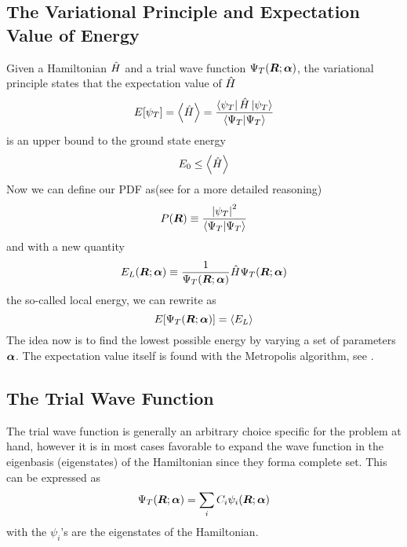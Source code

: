     \subsection{The Variational Principle and Expectation Value of Energy}
        Given a Hamiltonian $\hat{H}$ and a trial wave function ${\Psi}_T(\boldsymbol{{R}};\boldsymbol{{\alpha}})$, the
        variational principle \cite{GriffQuan, NeOr} states that the
        expectation value of $\hat{H}$
            \begin{equation}
                E[\psi_T] = \left< {\hat{H}} \right> =
                \frac{\bra{\psi_T}\hat{H}\ket{\psi_T}}{\bra{\Psi_T}\ket{\Psi_T}}
                \label{eq:ecpE}
            \end{equation}
        is an upper bound to the ground state energy
            \begin{equation}
                E_0 \leq \left< {\hat{H}} \right>
                \label{eq:ecpEBound}
            \end{equation}
        Now we can define our PDF as(see  for a more
        detailed reasoning)
            \begin{equation}
                P(\boldsymbol{{R}}) \equiv \frac{\abs{\psi_T}^2}{\bra{\Psi_T}\ket{\Psi_T}}
                \label{eq:PDFdef}
            \end{equation}
        and with a new quantity
            \begin{equation}
                E_L(\boldsymbol{{R}};\boldsymbol{{\alpha}}) \equiv \frac{1}{{\Psi}_T(\boldsymbol{{R}};\boldsymbol{{\alpha}})}\hat{H}{\Psi}_T(\boldsymbol{{R}};\boldsymbol{{\alpha}})
                \label{eq:ELdef}
            \end{equation}
        the so-called local energy, we can rewrite  as
            \begin{equation}
                E[{\Psi}_T(\boldsymbol{{R}};\boldsymbol{{\alpha}})] = \left< {E_L} \right>
            \end{equation}
        The idea now is to find the lowest possible energy by varying a set of
        parameters $\boldsymbol{{\alpha}}$. The expectation value itself is found with
        the Metropolis algorithm, see .

    \subsection{The Trial Wave Function}
        The trial wave function is generally an arbitrary choice specific for
        the problem at hand, however it is in most cases favorable to expand
        the wave function in the eigenbasis (eigenstates) of the Hamiltonian
        since they forma complete set. This can be expressed as
            \begin{equation}
                {\Psi}_T(\boldsymbol{{R}};\boldsymbol{{\alpha}}) = \sum_i C_i\psi_i(\boldsymbol{{R}};\boldsymbol{{\alpha}})
            \end{equation}
        with the $\psi_i$'s are the eigenstates of the Hamiltonian.

